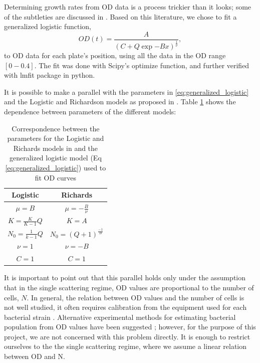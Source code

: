 \documentclass[10pt,a4paper]{scrartcl}
\begin{document}
Determining growth rates from OD data is a process trickier than it looks; some of the subtleties are discussed in \cite{ghenu_challenges_2024,krishnamurthi_new_2021}. 
Based on this literature,  we chose to fit a generalized logistic function, 
\begin{equation}
    OD(t) = \frac{A}{\left(C + Q\exp{-Bx}\right)^\frac{1}{\nu}},
    \label{eq:generalized_logistic}
\end{equation}
to OD data for each plate's position, using all the data in the OD range $[0-0.4]$. The fit was done with Scipy's optimize function, and further verified with lmfit package in python. 

It is possible to make a parallel with the parameters in \ref{eq:generalized_logistic} and the Logistic and Richardson models as proposed in \cite{ghenu_challenges_2024}. Table \ref{tab:parameters_correspondence} shows the dependence between parameters of the different models:

\begin{table}[H]
    \centering
    \begin{tabular}{|c|c|}
    \hline
    Logistic     & Richards\\
    \hline
    $\mu = B$     & $\mu = -\frac{B}{\nu}$\\
    $K = \frac{K}{K-1}Q$     & $K = A$\\
    $N_0 = \frac{1}{k-1}Q$     & $N_0 = \left(Q+1\right)^\frac{-1}{B}$\\
    $\nu = 1$     & $\nu = -B$\\
    $C = 1$ & $C = 1$\\
    \hline
    \end{tabular}
    \caption{Correspondence between the parameters for the Logistic and Richards models in \cite{ghenu_challenges_2024} and the generalized logistic model (Eq \ref{eq:generalized_logistic}) used to fit OD curves}
    \label{tab:parameters_correspondence}
\end{table}


It is important to point out that this parallel holds only under the assumption that in the single scattering regime, OD values are proportional to the number of cells, $N$. In general, the relation between OD values and the number of cells is not well studied, it often requires calibration from the equipment used for each bacterial strain \cite{mira_estimating_2022}. Alternative experimental methods for estimating bacterial population from OD values have been suggested \cite{beal_robust_2020}; however, for the purpose of this project, we are not concerned with this problem directly. It is enough to restrict ourselves to the the single scattering regime, where we assume a linear relation between OD and N.
\end{document}
